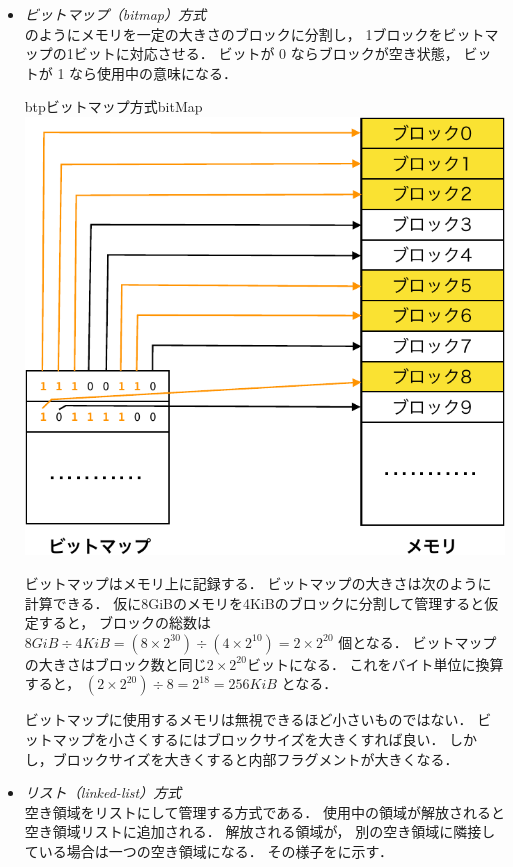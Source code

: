 \begin{itemize}
\item \emph{ビットマップ（bitmap）方式}\\
  のようにメモリを一定の大きさのブロックに分割し，
  1ブロックをビットマップの1ビットに対応させる．
  ビットが 0 ならブロックが空き状態，
  ビットが 1 なら使用中の意味になる．

  \begin{myfig}{btp}{ビットマップ方式}{bitMap}
    \includegraphics[scale=0.66]{Fig/bitMap-crop.pdf}
  \end{myfig}

  ビットマップはメモリ上に記録する．
  ビットマップの大きさは次のように計算できる．
  仮に8GiBのメモリを4KiBのブロックに分割して管理すると仮定すると，
  ブロックの総数は
  $8GiB \div 4KiB = (8\times 2^{30}) \div (4 \times 2^{10}) = 2 \times 2^{20}$
  個となる．
  ビットマップの大きさはブロック数と同じ$2 \times 2^{20}$ビットになる．
  これをバイト単位に換算すると，
  $(2 \times 2^{20}) \div 8 = 2^{18} = 256KiB$
  となる．

  ビットマップに使用するメモリは無視できるほど小さいものではない．
  ビットマップを小さくするにはブロックサイズを大きくすれば良い．
  しかし，ブロックサイズを大きくすると内部フラグメントが大きくなる．

\item \emph{リスト（linked-list）方式}\\
  空き領域をリストにして管理する方式である．
  使用中の領域が解放されると空き領域リストに追加される．
  解放される領域が，
  別の空き領域に隣接している場合は一つの空き領域になる．
  その様子をに示す．


\end{itemize}
